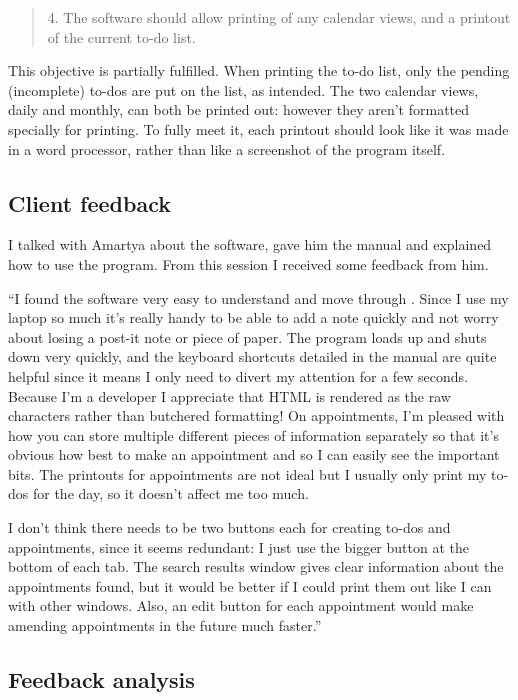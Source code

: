 \begin{quotation}
4. The software should allow printing of any calendar views, and a printout of
the current to-do list.
\end{quotation}

This objective is partially fulfilled. When printing the to-do list, only the
pending (incomplete) to-dos are put on the list, as intended. The two calendar
views, daily and monthly, can both be printed out: however they aren't
formatted specially for printing. To fully meet it, each printout should look
like it was made in a word processor, rather than like a screenshot of the program itself.


\subsection{Client feedback}

I talked with Amartya about the software, gave him the manual and explained how
to use the program. From this session I received some feedback from him.

``I found the software very easy to understand and move through . Since I use
my laptop so much it's really handy to be able to add a note quickly and not
worry about losing a post-it note or piece of paper. The program loads up and
shuts down very quickly, and the keyboard shortcuts detailed in the manual are
quite helpful since it means I only need to divert my attention for a few
seconds. Because I'm a developer I appreciate that HTML is rendered as the raw
characters rather than butchered formatting! On appointments, I'm pleased with
how you can store multiple different pieces of information separately so that
it's obvious how best to make an appointment and so I can easily see the
important bits. The printouts for appointments are not ideal but I usually only
print my to-dos for the day, so it doesn't affect me too much.

I don't think there needs to be two buttons each for creating to-dos and
appointments, since it seems redundant: I just use the bigger button at the
bottom of each tab. The search results window gives clear information
about the appointments found, but it would be better if I could print them out
like I can with other windows. Also, an edit button for each appointment would
make amending appointments in the future much faster.''


\subsection{Feedback analysis}

